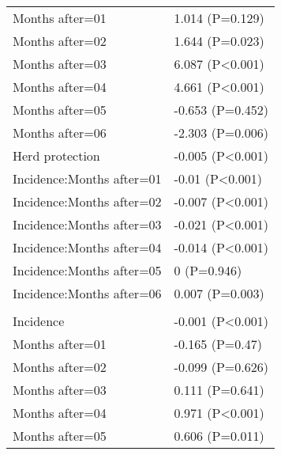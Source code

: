 \documentclass[]{article}
\begin{document}
\begin{longtable}[t]{ll}
\hspace{1em}Months after=01 & 1.014 (P=0.129)\\
\hspace{1em}Months after=02 & 1.644 (P=0.023)\\
\hspace{1em}Months after=03 & 6.087 (P<0.001)\\
\hspace{1em}Months after=04 & 4.661 (P<0.001)\\
\hspace{1em}Months after=05 & -0.653 (P=0.452)\\
\hspace{1em}Months after=06 & -2.303 (P=0.006)\\
\hspace{1em}Herd protection & -0.005 (P<0.001)\\
\hspace{1em}Incidence:Months after=01 & -0.01 (P<0.001)\\
\hspace{1em}Incidence:Months after=02 & -0.007 (P<0.001)\\
\hspace{1em}Incidence:Months after=03 & -0.021 (P<0.001)\\
\hspace{1em}Incidence:Months after=04 & -0.014 (P<0.001)\\
\hspace{1em}Incidence:Months after=05 & 0 (P=0.946)\\
\hspace{1em}Incidence:Months after=06 & 0.007 (P=0.003)\\
\addlinespace[1.5em]
\multicolumn{2}{l}{\textbf{Temporary field worker}}\\
\hspace{1em}Incidence & -0.001 (P<0.001)\\
\hspace{1em}Months after=01 & -0.165 (P=0.47)\\
\hspace{1em}Months after=02 & -0.099 (P=0.626)\\
\hspace{1em}Months after=03 & 0.111 (P=0.641)\\
\hspace{1em}Months after=04 & 0.971 (P<0.001)\\
\hspace{1em}Months after=05 & 0.606 (P=0.011)\\

\end{longtable}
\end{document}
